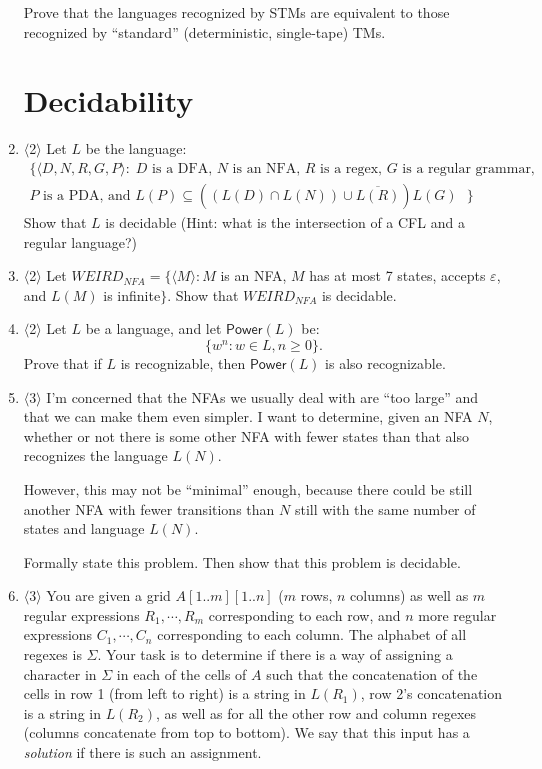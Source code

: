 \documentclass[]{article}
\newcommand{\Level}[1]{{\color{blue} $\langle$#1$\rangle$}}
\begin{document}
\begin{enumerate}
Prove that the languages recognized by STMs are equivalent to those recognized by ``standard'' (deterministic, single-tape) TMs.

\section{Decidability}

\item \Level{2} Let $L$ be the language:
\begin{align*}
\{ \langle D, N, R, G, P \rangle :\;\text{$D$ is a DFA, $N$ is an NFA, $R$ is a regex, $G$ is a regular grammar,}\\
\text{$P$ is a PDA, and $L(P) \subseteq ((L(D) \cap L(N)) \cup \overline{L(R)}) L(G)$ }   \}
\end{align*}
Show that $L$ is decidable (Hint: what is the intersection of a CFL and a regular language?)

\item \Level{2} Let $WEIRD_{NFA} = \{ \langle M \rangle : M$ is an NFA, $M$ has at most 7 states, accepts $\varepsilon$, and $L(M)$ is infinite$\}$.
Show that $WEIRD_{NFA}$ is decidable.

\item \Level{2} Let $L$ be a language, and let $\textsf{Power}(L)$ be:
\[
\{ w^n : w \in L, n \ge 0 \}.
\]
Prove that if $L$ is recognizable, then $\textsf{Power}(L)$ is also recognizable.

\item \Level{3} I'm concerned that the NFAs we usually deal with are ``too large'' and that we can make them even simpler. I want to determine, given an NFA $N$, whether or not there is some other NFA with fewer states than that also recognizes the language $L(N)$. 

However, this may not be ``minimal'' enough, because there could be still another NFA with fewer transitions than $N$ still with the same number of states and language $L(N)$. 

Formally state this problem. Then show that this problem is decidable.

\item \label{regex_crossword} \Level{3} You are given a grid $A[1..m][1..n]$ ($m$ rows, $n$ columns) as well as $m$ regular expressions $R_1, \cdots, R_m$ corresponding to each row, and $n$ more regular expressions $C_1, \cdots, C_n$ corresponding to each column. The alphabet of all regexes is $\Sigma$. Your task is to determine if there is a way of assigning a character in $\Sigma$ in each of the cells of $A$ such that the concatenation of the cells in row 1 (from left to right) is a string in $L(R_1)$, row 2's concatenation is a string in $L(R_2)$, as well as for all the other row and column regexes (columns concatenate from top to bottom). We say that this input has a \textit{solution} if there is such an assignment. 


\end{enumerate}
\end{document}
